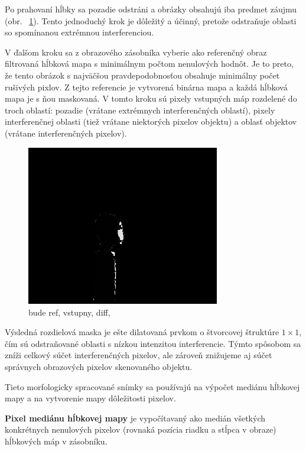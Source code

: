 Po prahovaní hĺbky sa pozadie odstráni a obrázky obsahujú iba predmet záujmu (obr. \, \ref{fig::treshold}). Tento jednoduchý krok je dôležitý a účinný, pretože odstraňuje oblasti so spomínanou extrémnou interferenciou.

V ďalšom kroku sa z obrazového zásobníka vyberie ako referenčný obraz filtrovaná hĺbková mapa s minimálnym počtom nenulových hodnôt. Je to preto, že tento obrázok s najväčšou pravdepodobnosťou obsahuje minimálny počet rušivých pixlov. Z tejto referencie je vytvorená binárna mapa a každá hĺbková mapa je s ňou maskovaná. V tomto kroku sú pixely vstupných máp rozdelené do troch oblastí: pozadie (vrátane extrémnych interferenčných oblastí), pixely interferenčnej oblasti (tiež vrátane niektorých pixelov objektu) a oblasť objektov (vrátane interferenčných pixelov).


\color{black}
\begin{figure}[H]
	\centering
	\includegraphics[height=7cm]{figures/interf_roi.png}
	\caption{bude ref, vstupny, diff, }
	\label{fig::treshold}
\end{figure}

Výsledná rozdielová maska je ešte dilatovaná prvkom o štvorcovej štruktúre $ 1 \times1 $, čím sú odstraňované oblasti s nízkou intenzitou interferencie. Týmto spôsobom sa zníži celkový súčet interferenčných pixelov, ale zároveň znižujeme aj súčet správnych obrazových pixelov skenovaného objektu. 

Tieto morfologicky spracované snímky sa používajú na výpočet mediánu hĺbkovej mapy a na vytvorenie mapy dôležitosti pixelov.\newline


\textbf{Pixel mediánu hĺbkovej mapy} je vypočítavaný ako medián všetkých konkrétnych nenulových pixelov (rovnaká pozícia riadku a stĺpca v obraze) hĺbkových máp v zásobníku. \newline

